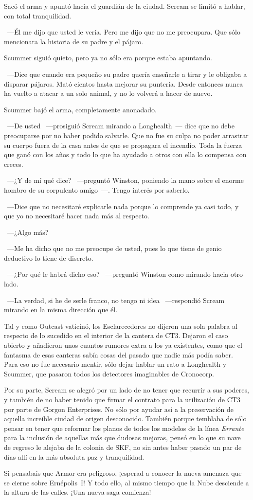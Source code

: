 Sacó el arma y apuntó hacia el guardián de la ciudad. Scream se limitó a hablar, con total tranquilidad.

~---Él me dijo que usted le vería. Pero me dijo que no me preocupara. Que sólo mencionara la historia de su padre y el pájaro.

Scummer siguió quieto, pero ya no sólo era porque estaba apuntando.

~---Dice que cuando era pequeño su padre quería enseñarle a tirar y le obligaba a disparar pájaros. Mató cientos hasta mejorar su puntería. Desde entonces nunca ha vuelto a atacar a un solo animal, y no lo volverá a hacer de nuevo.

Scummer bajó el arma, completamente anonadado.

~---De usted ~---prosiguió Scream mirando a Longhealth~--- dice que no debe preocuparse por no haber podido salvarle. Que no fue su culpa no poder arrastrar su cuerpo fuera de la casa antes de que se propagara el incendio. Toda la fuerza que ganó con los años y todo lo que ha ayudado a otros con ella lo compensa con creces.

~---¿Y de mí qué dice? ~---preguntó Winston, poniendo la mano sobre el enorme hombro de su corpulento amigo~---. Tengo interés por saberlo.

~---Dice que no necesitaré explicarle nada porque lo comprende ya casi todo, y que yo no necesitaré hacer nada más al respecto.

~---¿Algo más?

~---Me ha dicho que no me preocupe de usted, pues lo que tiene de genio deductivo lo tiene de discreto.

~---¿Por qué le habrá dicho eso? ~---preguntó Winston como mirando hacia otro lado.

~---La verdad, si he de serle franco, no tengo ni idea ~---respondió Scream mirando en la misma dirección que él.

\bigskip\noindent
Tal y como Outcast vaticinó, los Esclarecedores no dijeron una sola palabra al respecto de lo sucedido en el interior de la cantera de CT3. Dejaron el caso abierto y añadieron unos cuantos rumores extra a los ya existentes, como que el fantasma de esas canteras sabía cosas del pasado que nadie más podía saber. Para eso no fue necesario mentir, sólo dejar hablar un rato a Longhealth y Scummer, que pasaron todos los detectores imaginables de Cronocorp.

Por su parte, Scream se alegró por un lado de no tener que recurrir a sus poderes, y también de no haber tenido que firmar el contrato para la utilización de CT3 por parte de Gorgon Enterprises. No sólo por ayudar así a la preservación de aquella increíble ciudad de origen desconocido. También porque temblaba de sólo pensar en tener que reformar los planos de todos los modelos de la línea \emph{Errante} para la inclusión de aquellas más que dudosas mejoras, pensó en lo que su nave de regreso le alejaba de la colonia de SKF, no sin antes haber pasado un par de días allí en la más absoluta paz y tranquilidad.

\begin{next}
    Si pensabais que Armor era peligroso, ¡esperad a conocer la nueva amenaza que se cierne sobre Ernépolis~I! Y todo ello, al mismo tiempo que la Nube desciende a la altura de las calles. ¡Una nueva saga comienza!
\end{next}

\endinput
